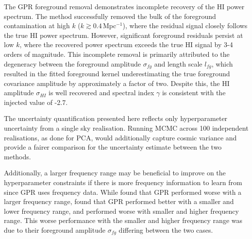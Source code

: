 The GPR foreground removal demonstrates incomplete recovery of the HI power spectrum. The method successfully removed the bulk of the foreground contamination at high $k$ ($k \gtrsim 0.4$\,Mpc$^{-1}$), where the residual signal closely follows the true HI power spectrum. However, significant foreground residuals persist at low $k$, where the recovered power spectrum exceeds the true HI signal by 3-4 orders of magnitude. This incomplete removal is primarily attributed to the degeneracy between the foreground amplitude $\sigma_{fg}$ and length scale $l_{fg}$, which resulted in the fitted foreground kernel underestimating the true foreground covariance amplitude by approximately a factor of two. Despite this, the HI amplitude $\sigma_{HI}$ is well recovered and spectral index $\gamma$ is consistent with the injected value of -2.7. 

The uncertainty quantification presented here reflects only hyperparameter uncertainty from a single sky realisation. Running MCMC across 100 independent realisations, as done for PCA, would additionally capture cosmic variance and provide a fairer comparison for the uncertainty estimate between the two methods.

Additionally, a larger frequency range may be beneficial to improve on the hyperparameter constraints if there is more frequency information to learn from since GPR uses frequency data. While \cite{hothiComparingForegroundRemoval2021} found that GPR performed worse with a larger frequency range, \cite{soaresGaussianProcessRegression2022} found that GPR performed better with a smaller and lower frequency range, and performed worse with smaller and higher frequency range. This worse performance with the smaller and higher frequency range was due to their foreground amplitude $\sigma_{fg}$ differing between the two cases.